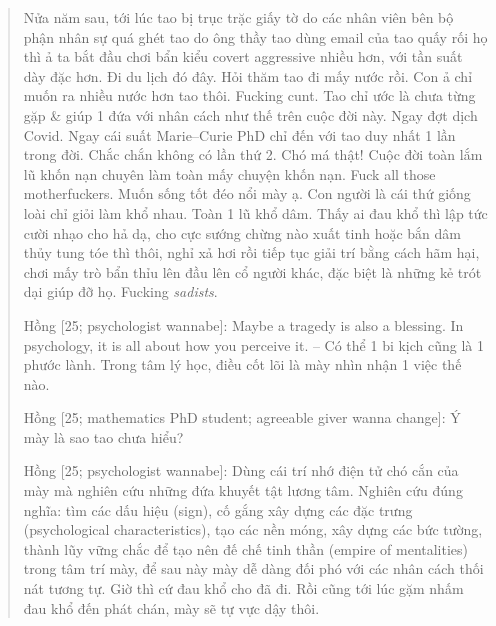 \documentclass[12pt]{article}
\begin{document}
\begin{quote}
	Nửa năm sau, tới lúc tao bị trục trặc giấy tờ do các nhân viên bên bộ phận nhân sự quá ghét tao do ông thầy tao dùng email của tao quấy rối họ thì ả ta bắt đầu chơi bẩn kiểu covert aggressive nhiều hơn, với tần suất dày đặc hơn. Đi du lịch đó đây. Hỏi thăm tao đi mấy nước rồi. Con ả chỉ muốn ra nhiều nước hơn tao thôi. Fucking cunt. Tao chỉ ước là chưa từng gặp \& giúp 1 đứa với nhân cách như thế trên cuộc đời này. Ngay đợt dịch Covid. Ngay cái suất Marie--Curie PhD chỉ đến với tao duy nhất 1 lần trong đời. Chắc chắn không có lần thứ 2. Chó má thật! Cuộc đời toàn lắm lũ khốn nạn chuyên làm toàn mấy chuyện khốn nạn. Fuck all those motherfuckers. Muốn sống tốt đéo nổi mày ạ. Con người là cái thứ giống loài chỉ giỏi làm khổ nhau. Toàn 1 lũ khổ dâm. Thấy ai đau khổ thì lập tức cười nhạo cho hả dạ, cho cực sướng chừng nào xuất tinh hoặc bắn dâm thủy tung tóe thì thôi, nghỉ xả hơi rồi tiếp tục giải trí bằng cách hãm hại, chơi mấy trò bẩn thỉu lên đầu lên cổ người khác, đặc biệt là những kẻ trót dại giúp đỡ họ. Fucking {\it sadists}.
	
	{\sf Hồng [25; psychologist wannabe]}: Maybe a tragedy is also a blessing. In psychology, it is all about how you perceive it. -- Có thể 1 bi kịch cũng là 1 phước lành. Trong tâm lý học, điều cốt lõi là mày nhìn nhận 1 việc thế nào.
	
	{\sf Hồng [25; mathematics PhD student; agreeable giver wanna change]}: Ý mày là sao tao chưa hiểu?
	
	{\sf Hồng [25; psychologist wannabe]}: Dùng cái trí nhớ điện tử chó cắn của mày mà nghiên cứu những đứa khuyết tật lương tâm. Nghiên cứu đúng nghĩa: tìm các dấu hiệu (sign), cố gắng xây dựng các đặc trưng (psychological characteristics), tạo các nền móng, xây dựng các bức tường, thành lũy vững chắc để tạo nên đế chế tinh thần (empire of mentalities) trong tâm trí mày, để sau này mày dễ dàng đối phó với các nhân cách thối nát tương tự. Giờ thì cứ đau khổ cho đã đi. Rồi cũng tới lúc gặm nhấm đau khổ đến phát chán, mày sẽ tự vực dậy thôi.
\end{quote}
\end{document}
